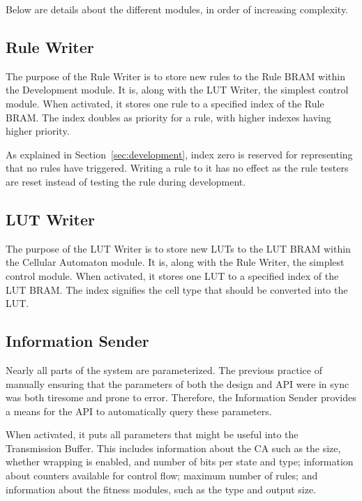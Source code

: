 Below are details about the different modules, in order of increasing complexity.

\subsection{Rule Writer}

The purpose of the Rule Writer is to store new rules to the Rule BRAM within the Development module.
It is, along with the LUT Writer, the simplest control module.
When activated, it stores one rule to a specified index of the Rule BRAM.
The index doubles as priority for a rule, with higher indexes having higher priority.

As explained in Section~\ref{sec:development}, index zero is reserved for representing that no rules have triggered.
Writing a rule to it has no effect as the rule testers are reset instead of testing the rule during development.

\subsection{LUT Writer}

The purpose of the LUT Writer is to store new LUTs to the LUT BRAM within the Cellular Automaton module.
It is, along with the Rule Writer, the simplest control module.
When activated, it stores one LUT to a specified index of the LUT BRAM.
The index signifies the cell type that should be converted into the LUT.

\subsection{Information Sender}

Nearly all parts of the system are parameterized.
The previous practice of manually ensuring that the parameters of both the design and API were in sync was both tiresome and prone to error.
Therefore, the Information Sender provides a means for the API to automatically query these parameters.

When activated, it puts all parameters that might be useful into the Transmission Buffer.
This includes information about the CA such as the size, whether wrapping is enabled, and number of bits per state and type;
information about counters available for control flow;
maximum number of rules;
and information about the fitness modules, such as the type and output size.

